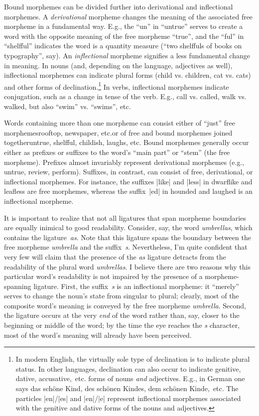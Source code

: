 \documentclass[11pt]{article}
\begin{document}
Bound morphemes can be divided further into derivational and inflectional morphemes. A \emph{derivational} morpheme changes the meaning of the associated free morpheme in a fundamental way. E.g., the \enquote{un} in \enquote{untrue} serves to create a word with the opposite meaning of the free morpheme \enquote{true}, and the \enquote{ful} in \enquote{shelfful} indicates the word is a quantity measure (\enquote{two shelffuls of books on typography}, say). 
An \emph{inflectional} morpheme signifies a less fundamental change in meaning. In nouns (and, depending on the language, adjectives as well), inflectional morphemes can indicate plural forms (child vs. children, cat vs. cats) and other forms of declination.\footnote{In modern English, the virtually sole type of declination is to indicate plural status. In other languages, declination can also occur to indicate genitive, dative, accusative,~etc. forms of nouns \emph{and} adjectives. E.g., in German one says das schöne Kind, des schönen Kindes, dem schönen Kinde,~etc. The particles |en|/|es| and |en|/|e| represent inflectional morphemes associated with the genitive and dative forms of the nouns and adjectives.} In verbs, inflectional morphemes indicate conjugation, such as a change in tense of the verb. E.g., call vs. called, walk vs. walked, but also \enquote{swim} vs. \enquote{swims}, etc. 

Words containing more than one morpheme can consist either of \enquote{just} free morphemes\textemdash rooftop, newspaper, etc.\textemdash or of free and bound morphemes joined together\textemdash untrue, shelfful, childish, laughs, etc. Bound morphemes generally occur either as prefixes or suffixes to the word's \enquote{main part} or \enquote{stem} (the free morpheme). Prefixes almost invariably represent derivational morphemes (e.g., untrue, review, perform). Suffixes, in contrast, can consist of free, derivational,  or inflectional morphemes. For instance, the suffixes |like| and |less| in dwarflike and leafless are free morphemes, whereas the suffix~|ed| in hounded and laughed is an inflectional morpheme. 

It is important to realize that not all ligatures that span morpheme boundaries are equally inimical to good readability. Consider, say, the word \emph{umbrellas}, which contains the ligature~\emph{as}. Note that this ligature spans the boundary between the free morpheme \emph{umbrella} and the suffix~\emph{s}. Nevertheless, I'm quite confident that very few will claim that the presence of the \emph{as} ligature detracts from the readability of the plural word \emph{umbrellas}. I believe there are two reasons why this particular word's readability is not impaired by the presence of a morpheme-spanning ligature. First, the suffix~\emph{s} is an inflectional morpheme: it \enquote{merely} serves to change the noun's state from singular to plural; clearly, most of the composite word's meaning is conveyed by the free morpheme \emph{umbrella}. Second, the ligature occurs at the very \emph{end} of the word rather than, say, closer to the beginning or middle of the word; by the time the eye reaches the \emph{s} character, most of the word's meaning will already have been perceived.
\end{document}
